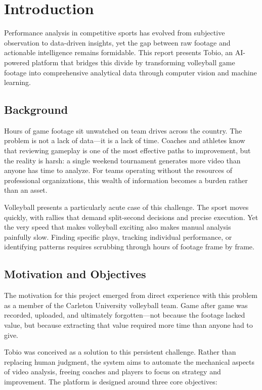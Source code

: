 \chapter{Introduction}

Performance analysis in competitive sports has evolved from subjective observation to data-driven insights, yet the gap between raw footage and actionable intelligence remains formidable. This report presents Tobio, an AI-powered platform that bridges this divide by transforming volleyball game footage into comprehensive analytical data through computer vision and machine learning.

\section{Background}

Hours of game footage sit unwatched on team drives across the country. The problem is not a lack of data—it is a lack of time. Coaches and athletes know that reviewing gameplay is one of the most effective paths to improvement, but the reality is harsh: a single weekend tournament generates more video than anyone has time to analyze. For teams operating without the resources of professional organizations, this wealth of information becomes a burden rather than an asset.

Volleyball presents a particularly acute case of this challenge. The sport moves quickly, with rallies that demand split-second decisions and precise execution. Yet the very speed that makes volleyball exciting also makes manual analysis painfully slow. Finding specific plays, tracking individual performance, or identifying patterns requires scrubbing through hours of footage frame by frame.

\section{Motivation and Objectives}

The motivation for this project emerged from direct experience with this problem as a member of the Carleton University volleyball team. Game after game was recorded, uploaded, and ultimately forgotten—not because the footage lacked value, but because extracting that value required more time than anyone had to give.

Tobio was conceived as a solution to this persistent challenge. Rather than replacing human judgment, the system aims to automate the mechanical aspects of video analysis, freeing coaches and players to focus on strategy and improvement. The platform is designed around three core objectives:

